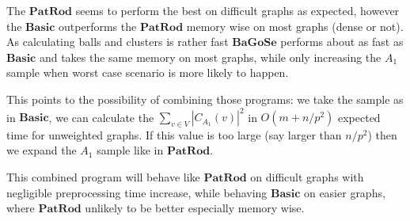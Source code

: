 \documentclass[shortabstract, lic, english]{iithesis}
\theoremstyle{definition} \newtheorem{definition}{Definition}[chapter]
\theoremstyle{plain} \newtheorem{remark}[definition]{Observation}
\theoremstyle{plain} \newtheorem{theorem}[definition]{Theorem}
\theoremstyle{plain} \newtheorem{lemma}[definition]{Lemma}
\theoremstyle{plain} \newtheorem{conjecture}[definition]{Conjecture}
\begin{document}
The $\mathbf{PatRod}$ seems to perform the best on difficult graphs as expected, however the $\mathbf{Basic}$ outperforms the $\mathbf{PatRod}$ memory wise on most graphs (dense or not).
As calculating balls and clusters is rather fast $\mathbf{BaGoSe}$ performs about as fast as $\mathbf{Basic}$ and takes the same memory on most graphs, while only increasing the $A_1$ sample when worst case scenario is more likely to happen.

This points to the possibility of combining those programs:
we take the sample as in $\mathbf{Basic}$, we can calculate the $\sum_{v \in V} |C_{A_1}(v)|^2$ in $O(m + n/p^2)$ expected time for unweighted graphs.
If this value is too large (say larger than $n/p^2$) then we expand the $A_1$ sample like in $\mathbf{PatRod}$.

This combined program will behave like $\mathbf{PatRod}$ on difficult graphs with negligible preprocessing time increase,
while behaving $\mathbf{Basic}$ on easier graphs, where $\mathbf{PatRod}$ unlikely to be better especially memory wise.







\end{document}
